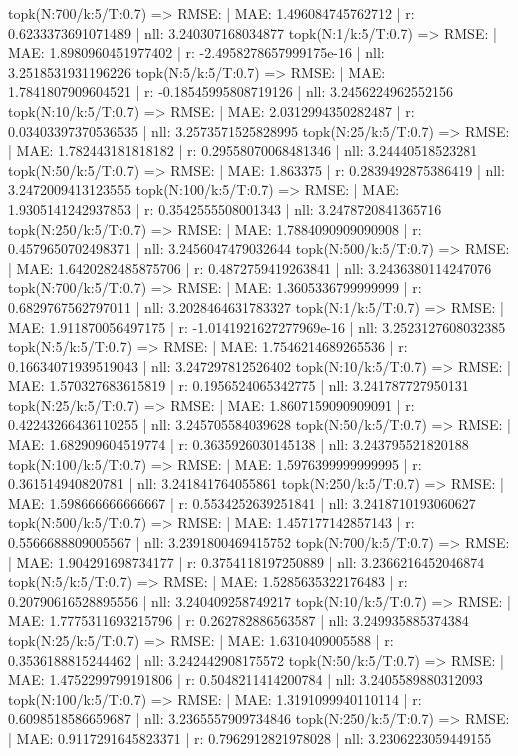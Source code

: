 topk(N:700/k:5/T:0.7) => RMSE: | MAE: 1.496084745762712 | r: 0.6233373691071489 | nll: 3.240307168034877
topk(N:1/k:5/T:0.7) => RMSE: | MAE: 1.8980960451977402 | r: -2.4958278657999175e-16 | nll: 3.2518531931196226
topk(N:5/k:5/T:0.7) => RMSE: | MAE: 1.7841807909604521 | r: -0.18545995808719126 | nll: 3.2456224962552156
topk(N:10/k:5/T:0.7) => RMSE: | MAE: 2.0312994350282487 | r: 0.03403397370536535 | nll: 3.2573571525828995
topk(N:25/k:5/T:0.7) => RMSE: | MAE: 1.782443181818182 | r: 0.29558070068481346 | nll: 3.24440518523281
topk(N:50/k:5/T:0.7) => RMSE: | MAE: 1.863375 | r: 0.2839492875386419 | nll: 3.2472009413123555
topk(N:100/k:5/T:0.7) => RMSE: | MAE: 1.9305141242937853 | r: 0.3542555508001343 | nll: 3.2478720841365716
topk(N:250/k:5/T:0.7) => RMSE: | MAE: 1.7884090909090908 | r: 0.4579650702498371 | nll: 3.2456047479032644
topk(N:500/k:5/T:0.7) => RMSE: | MAE: 1.6420282485875706 | r: 0.4872759419263841 | nll: 3.2436380114247076
topk(N:700/k:5/T:0.7) => RMSE: | MAE: 1.3605336799999999 | r: 0.6829767562797011 | nll: 3.2028464631783327
topk(N:1/k:5/T:0.7) => RMSE: | MAE: 1.911870056497175 | r: -1.0141921627277969e-16 | nll: 3.2523127608032385
topk(N:5/k:5/T:0.7) => RMSE: | MAE: 1.7546214689265536 | r: 0.16634071939519043 | nll: 3.247297812526402
topk(N:10/k:5/T:0.7) => RMSE: | MAE: 1.570327683615819 | r: 0.1956524065342775 | nll: 3.241787727950131
topk(N:25/k:5/T:0.7) => RMSE: | MAE: 1.8607159090909091 | r: 0.42243266436110255 | nll: 3.245705584039628
topk(N:50/k:5/T:0.7) => RMSE: | MAE: 1.682909604519774 | r: 0.3635926030145138 | nll: 3.243795521820188
topk(N:100/k:5/T:0.7) => RMSE: | MAE: 1.5976399999999995 | r: 0.361514940820781 | nll: 3.241841764055861
topk(N:250/k:5/T:0.7) => RMSE: | MAE: 1.598666666666667 | r: 0.5534252639251841 | nll: 3.2418710193060627
topk(N:500/k:5/T:0.7) => RMSE: | MAE: 1.457177142857143 | r: 0.5566688809005567 | nll: 3.2391800469415752
topk(N:700/k:5/T:0.7) => RMSE: | MAE: 1.904291698734177 | r: 0.3754118197250889 | nll: 3.2366216452046874
topk(N:5/k:5/T:0.7) => RMSE: | MAE: 1.5285635322176483 | r: 0.20790616528895556 | nll: 3.240409258749217
topk(N:10/k:5/T:0.7) => RMSE: | MAE: 1.7775311693215796 | r: 0.262782886563587 | nll: 3.249935885374384
topk(N:25/k:5/T:0.7) => RMSE: | MAE: 1.6310409005588 | r: 0.3536188815244462 | nll: 3.242442908175572
topk(N:50/k:5/T:0.7) => RMSE: | MAE: 1.4752299799191806 | r: 0.5048211414200784 | nll: 3.2405589880312093
topk(N:100/k:5/T:0.7) => RMSE: | MAE: 1.3191099940110114 | r: 0.6098518586659687 | nll: 3.2365557909734846
topk(N:250/k:5/T:0.7) => RMSE: | MAE: 0.9117291645823371 | r: 0.7962912821978028 | nll: 3.2306223059449155
